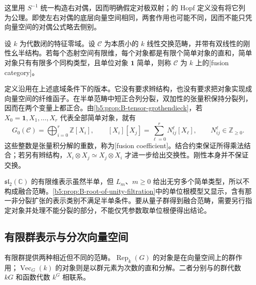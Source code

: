 这里用 \(S^{-1}\) 统一构造右对偶，因而明确假定对极双射；的 Hopf 定义没有将它列为公理。即使左右对偶的底层向量空间相同，两套作用也可能不同，因而不能只凭向量空间的对偶公式略去侧别。

\begin{definition}\label{b5:def:B-fusion}
	设 \(k\) 为代数闭的特征零域。设 \(\mathcal C\) 为本质小的 \(k\) 线性交换范畴，并带有双线性的刚性幺半结构。若每个态射空间有限维，每个对象都是有限个简单对象的直和，简单对象只有有限多个同构类型，且单位对象 \(\mathbf1\) 简单，则称 \(\mathcal C\) 为 \(k\) 上的[fusion category]。
\end{definition}

定义沿用\cite[Definition 4.1.1, p. 65]{EtingofEtAl2015TensorCategories}在上述底域条件下的版本。它没有要求辫结构，也没有要求把对象实现成向量空间的纤维函子。在半单范畴中短正合列分裂，双加性的张量积保持分裂列，因而在两个变量上都正合。由\cref{b5:prop:B-tensor-grothendieck}，若 \(X_0=\mathbf1,X_1,\ldots,X_r\) 代表全部简单对象，就有
\[
	G_0(\mathcal C)=\bigoplus_{i=0}^r\mathbb Z[X_i],\qquad
	[X_i][X_j]=\sum_{\ell=0}^r N_{ij}^{\ell}[X_\ell],\qquad
	N_{ij}^{\ell}\in\mathbb Z_{\ge0}.
\]
这些整数是张量积分解的重数，称为[fusion coefficient]。结合约束保证所得乘法结合；若另有辫结构，\(X_i\otimes X_j\simeq X_j\otimes X_i\) 才进一步给出交换性。刚性本身并不保证交换。

\ProseParagraphBreak
\(\mathfrak{sl}_2(\mathbb C)\) 的有限维表示虽然半单，但 \(L_m\)、\(m\ge0\) 给出无穷多个简单类型，所以不构成融合范畴。\cref{b5:prop:B-root-of-unity-filtration}中的单位根模型又显示，含有那一非分裂扩张的表示类别不满足半单条件。要从量子群得到融合范畴，需要另行指定对象并处理不能分裂的部分，不能仅凭参数取单位根便得出结论。

\subsection{有限群表示与分次向量空间}
\label{b5:subsec:B05:03}

有限群提供两种相近但不同的范畴。\(\operatorname{Rep}_k(G)\) 的对象是在向量空间上的群作用；\(\operatorname{Vec}_G(k)\) 的对象则是以群元素为次数的直和分解。二者分别与的群代数 \(kG\) 和函数代数 \(k^G\) 相联系。

